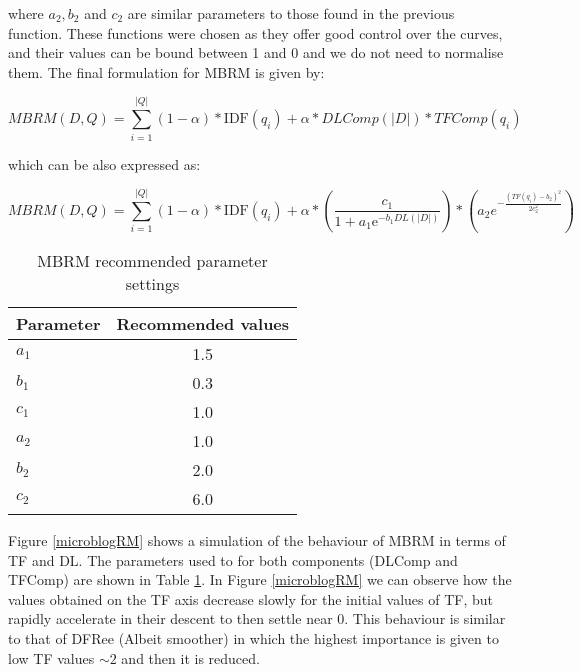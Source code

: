 where \(a_2, b_2\) and \(c_2\) are similar parameters to those found in the previous function. These functions were chosen as they offer good control over the curves, and their values can be bound between 1 and 0 and we do not need to normalise them. The final formulation for MBRM is given by: 

\begin{equation}
MBRM(D,Q) = \sum_{i=1}^{|Q|} (1-\alpha)*\text{IDF}(q_i) + \alpha * DLComp(|D|) * TFComp(q_i)
\end{equation}

which can be also expressed as:

\begin{equation}
MBRM(D,Q) = \sum_{i=1}^{|Q|} (1-\alpha)*\text{IDF}(q_i) + \alpha * \left({\frac  {c_1}{1+{a_1\mathrm e}^{{-b_1DL(|D|)}}}} \right) * \left(a_2e^{-{\frac {(TF(q_i)-b_2)^{2}}{2c_2^{2}}}}\right) 
\end{equation}

\begin{table}[b]
	\caption{MBRM recommended parameter settings} 
	\centering
	\begin{tabular}{l|c} 	
		\hline
		\textbf{Parameter} & \textbf{Recommended values} \\
		\hline
		\centering					 
		$a_1$ & 1.5 \\
		$b_1$ & 0.3 \\
		$c_1$ & 1.0 \\
		\hline
		$a_2$ & 1.0 \\
		$b_2$ & 2.0 \\
		$c_2$ & 6.0 \\
		\hline
	\end{tabular}
	\label{recommended settings}
\end{table}

Figure \ref{microblogRM} shows a simulation of the behaviour of MBRM in terms of TF and DL. The parameters used to for both components (DLComp and TFComp) are shown in Table \ref{recommended settings}. In Figure \ref{microblogRM} we can observe how the values obtained on the TF axis decrease slowly for the initial values of TF, but rapidly accelerate in their descent to then settle near 0. This behaviour is similar to that of DFRee (Albeit smoother) in which the highest importance is given to low TF values $\sim2$ and then it is reduced. 

